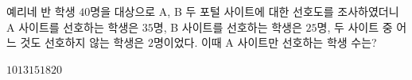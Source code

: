 예리네 반 학생 $40$명을 대상으로 A, B 두 포털 사이트에 대한 선호도를 조사하였더니 A 사이트를 선호하는 학생은 $35$명, B 사이트를 선호하는 학생은 $25$명, 두 사이트 중 어느 것도 선호하지 않는 학생은 $2$명이었다. 이때 A 사이트만 선호하는 학생 수는?
\begin{choices32}{$10$}{$13$}{$15$}{$18$}{$20$}\end{choices32}
